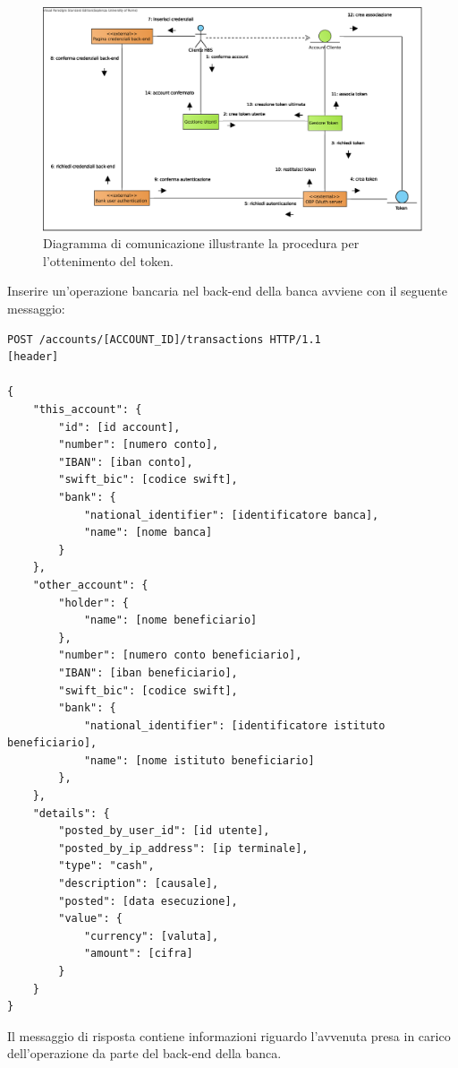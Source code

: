 \begin{figure}[h]
    \centering
	\includegraphics[width=\textwidth]{Images/Ottenimento_Token.eps}
    \caption{Diagramma di comunicazione illustrante la procedura per l'ottenimento del token.}
    \label{fig:oauth:token}
\end{figure}

Inserire un'operazione bancaria nel back-end della banca avviene con il seguente messaggio:
\begin{lstlisting}[basicstyle=\ttfamily]
POST /accounts/[ACCOUNT_ID]/transactions HTTP/1.1
[header]

{
    "this_account": {
        "id": [id account],
        "number": [numero conto],
        "IBAN": [iban conto],
        "swift_bic": [codice swift],
        "bank": {
            "national_identifier": [identificatore banca],
            "name": [nome banca]
        }
    },
    "other_account": {
        "holder": {
            "name": [nome beneficiario]
        },
        "number": [numero conto beneficiario],
        "IBAN": [iban beneficiario],
        "swift_bic": [codice swift],
        "bank": {
            "national_identifier": [identificatore istituto beneficiario],
            "name": [nome istituto beneficiario]
        },
    },
    "details": {
        "posted_by_user_id": [id utente],
        "posted_by_ip_address": [ip terminale],
        "type": "cash",
        "description": [causale],
        "posted": [data esecuzione],
        "value": {
            "currency": [valuta],
            "amount": [cifra]
        }
    }
}
\end{lstlisting}
Il messaggio di risposta contiene informazioni riguardo l'avvenuta presa in carico dell'operazione da parte del back-end della banca.
